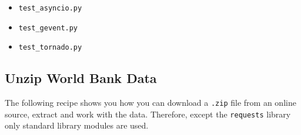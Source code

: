 \begin{itemize}
    \item \lstinline{test_asyncio.py}
    \item \lstinline{test_gevent.py}
    \item \lstinline{test_tornado.py}
\end{itemize}


\subsection{Unzip World Bank Data}

The following recipe shows you how you can download a \lstinline{.zip} file from an online source, extract and work with the data.
Therefore, except the \lstinline{requests} library only standard library modules are used.


